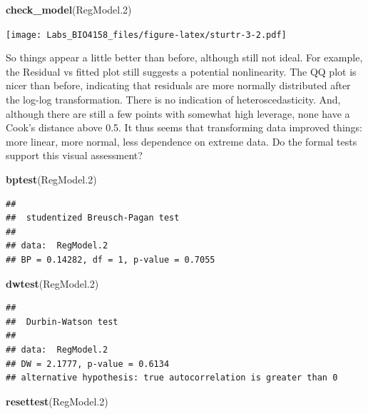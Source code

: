 \documentclass[
  12pt,
]{book}
\newenvironment{Shaded}{\begin{snugshade}}{\end{snugshade}}
\newcommand{\FloatTok}[1]{\textcolor[rgb]{0.00,0.00,0.81}{#1}}
\newcommand{\KeywordTok}[1]{\textcolor[rgb]{0.13,0.29,0.53}{\textbf{#1}}}
\newcommand{\NormalTok}[1]{#1}
\begin{document}
\begin{Shaded}
\begin{Highlighting}[]
\KeywordTok{check\_model}\NormalTok{(RegModel}\FloatTok{.2}\NormalTok{)}
\end{Highlighting}
\end{Shaded}

\texttt{[image: Labs\_BIO4158\_files/figure-latex/sturtr-3-2.pdf]}

So things appear a little better than before, although still not ideal. For example, the Residual vs fitted plot still suggests a potential nonlinearity. The QQ plot is nicer than before, indicating that residuals are more normally distributed after the log-log transformation. There is no indication of heteroscedasticity. And, although there are still a few points with somewhat high leverage, none have a Cook's distance above 0.5. It thus seems that transforming data improved things: more linear, more normal, less dependence on extreme data. Do the formal tests support this visual assessment?

\begin{Shaded}
\begin{Highlighting}[]
\KeywordTok{bptest}\NormalTok{(RegModel}\FloatTok{.2}\NormalTok{)}
\end{Highlighting}
\end{Shaded}

\begin{verbatim}
## 
##  studentized Breusch-Pagan test
## 
## data:  RegModel.2
## BP = 0.14282, df = 1, p-value = 0.7055
\end{verbatim}

\begin{Shaded}
\begin{Highlighting}[]
\KeywordTok{dwtest}\NormalTok{(RegModel}\FloatTok{.2}\NormalTok{)}
\end{Highlighting}
\end{Shaded}

\begin{verbatim}
## 
##  Durbin-Watson test
## 
## data:  RegModel.2
## DW = 2.1777, p-value = 0.6134
## alternative hypothesis: true autocorrelation is greater than 0
\end{verbatim}

\begin{Shaded}
\begin{Highlighting}[]
\KeywordTok{resettest}\NormalTok{(RegModel}\FloatTok{.2}\NormalTok{)}
\end{Highlighting}
\end{Shaded}
\end{document}
